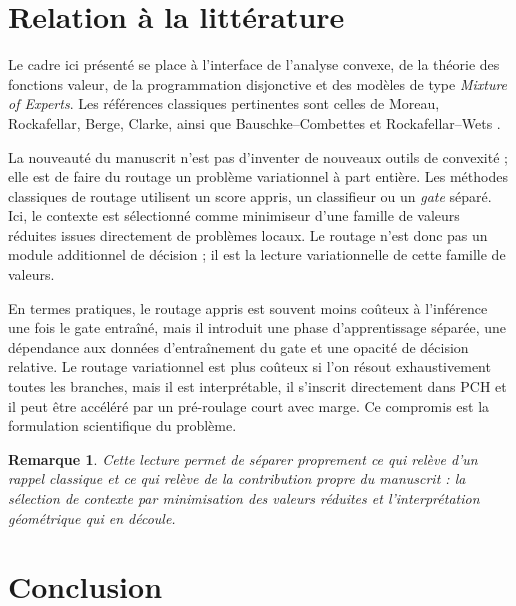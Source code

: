 \documentclass[11pt,a4paper]{article}
\newtheorem{remark}{Remarque}[section]
\begin{document}
\section{Relation à la littérature}

Le cadre ici présenté se place à l'interface de l'analyse convexe, de la théorie des fonctions valeur, de la programmation disjonctive et des modèles de type \emph{Mixture of Experts}. Les références classiques pertinentes sont celles de Moreau, Rockafellar, Berge, Clarke, ainsi que Bauschke--Combettes et Rockafellar--Wets \cite{Moreau1965,Rockafellar1970,Berge1963,Clarke1983,BauschkeCombettes2017,RockafellarWets1998}.

La nouveauté du manuscrit n'est pas d'inventer de nouveaux outils de convexité ; elle est de faire du routage un problème variationnel à part entière. Les méthodes classiques de routage utilisent un score appris, un classifieur ou un \emph{gate} séparé. Ici, le contexte est sélectionné comme minimiseur d'une famille de valeurs réduites issues directement de problèmes locaux. Le routage n'est donc pas un module additionnel de décision ; il est la lecture variationnelle de cette famille de valeurs.

En termes pratiques, le routage appris est souvent moins coûteux à l'inférence une fois le gate entraîné, mais il introduit une phase d'apprentissage séparée, une dépendance aux données d'entraînement du gate et une opacité de décision relative. Le routage variationnel est plus coûteux si l'on résout exhaustivement toutes les branches, mais il est interprétable, il s'inscrit directement dans PCH et il peut être accéléré par un pré-roulage court avec marge. Ce compromis est la formulation scientifique du problème.

\begin{remark}
Cette lecture permet de séparer proprement ce qui relève d'un rappel classique et ce qui relève de la contribution propre du manuscrit : la sélection de contexte par minimisation des valeurs réduites et l'interprétation géométrique qui en découle.
\end{remark}

\section{Conclusion}
\end{document}
